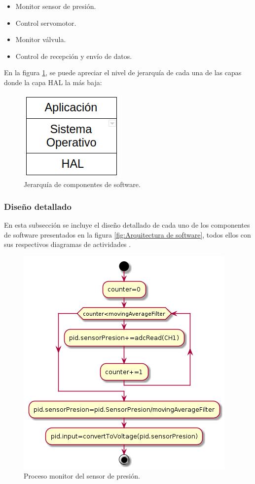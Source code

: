 \begin{itemize}
\item Monitor sensor de presión.
\item Control servomotor.
\item Monitor válvula.
\item Control de recepción y envío de datos.
\end{itemize}

En la figura \ref{fig:Capas de componentes de software}, se puede apreciar el nivel de jerarquía de cada una de las capas donde la capa HAL la  más baja: 

\begin{figure}[htpb]
\centering
\includegraphics[scale=.65]{./Figures/JerarquiaDeCapas-Software.png}
\caption{Jerarquía de componentes de software.}
\label{fig:Capas de componentes de software}
\end{figure}

\subsubsection{Diseño detallado}
En esta subsección se incluye el diseño detallado de cada uno de los componentes de software presentados en la figura \ref{fig:Arquitectura de software}, todos ellos con sus respectivos diagramas de actividades \citep{DIAGRAMADEACTIVIDADES}. 

	\begin{figure}[htpb]
	\centering
	\includegraphics[scale=.65]{./Figures/Procesomonitorsensordepresion.png}
	\caption{Proceso monitor del sensor de presión.}
	\label{fig:Control servomotor}
	\end{figure}
	
